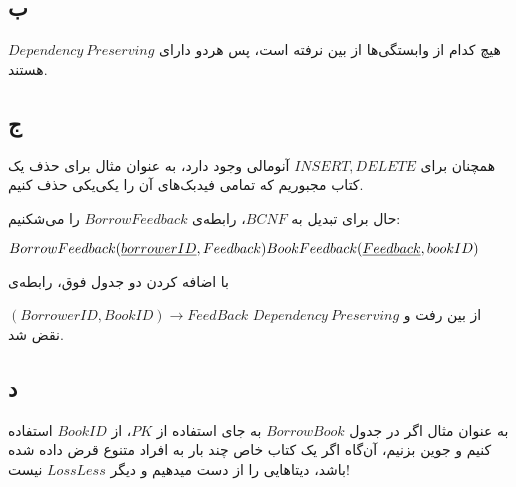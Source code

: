 \subsection*{ب}

هیچ کدام از وابستگی‌ها از بین نرفته است، پس هردو دارای 
$Dependency \ Preserving$
هستند.
\pagebreak 

\subsection*{ج}

همچنان برای $INSERT,DELETE$ آنومالی وجود دارد، به عنوان مثال برای حذف یک کتاب مجبوریم که تمامی فیدبک‌های آن را یکی‌یکی حذف کنیم.

حال برای تبدیل به $BCNF$، رابطه‌ی $BorrowFeedback$ را می‌شکنیم:

\setLTR
$
BorrowFeedback(\underline{borrowerID},Feedback)\\ \\
BookFeedback(\underline{Feedback},bookID)
$
\setRTL


با اضافه کردن دو جدول فوق، رابطه‌ی 

$(BorrowerID,BookID)\rightarrow FeedBack$
از بین رفت و 
$Dependency \ Preserving$
نقض شد.

\subsection*{د}
به عنوان مثال اگر در جدول $BorrowBook$ به جای استفاده از $PK$، از $BookID$ استفاده کنیم و جوین بزنیم، آن‌گاه اگر یک کتاب خاص چند بار به افراد متنوع قرض داده شده باشد، دیتاهایی را از دست میدهیم و دیگر $LossLess$ نیست!



